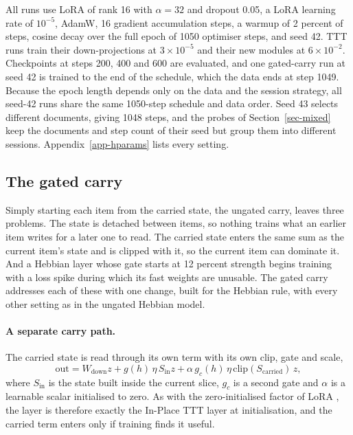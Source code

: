 \documentclass[12pt,a4paper]{report}
\begin{document}
All runs use LoRA of rank 16 with $\alpha = 32$ and dropout 0.05, a LoRA learning rate of $10^{-5}$, AdamW, 16 gradient accumulation steps, a warmup of 2 percent of steps, cosine decay over the full epoch of 1050 optimiser steps, and seed 42. TTT runs train their down-projections at $3 \times 10^{-5}$ and their new modules at $6 \times 10^{-2}$. Checkpoints at steps 200, 400 and 600 are evaluated, and one gated-carry run at seed 42 is trained to the end of the schedule, which the data ends at step 1049. Because the epoch length depends only on the data and the session strategy, all seed-42 runs share the same 1050-step schedule and data order. Seed 43 selects different documents, giving 1048 steps, and the probes of Section~\ref{sec-mixed} keep the documents and step count of their seed but group them into different sessions. Appendix~\ref{app-hparams} lists every setting.

\subsection{The gated carry}
\label{sec-design-method}

Simply starting each item from the carried state, the ungated carry, leaves three problems. The state is detached between items, so nothing trains what an earlier item writes for a later one to read. The carried state enters the same sum as the current item's state and is clipped with it, so the current item can dominate it. And a Hebbian layer whose gate starts at 12 percent strength begins training with a loss spike during which its fast weights are unusable. The gated carry addresses each of these with one change, built for the Hebbian rule, with every other setting as in the ungated Hebbian model.

\paragraph{A separate carry path.} The carried state is read through its own term with its own clip, gate and scale,
\begin{equation}
  \mathrm{out} = W_{\mathrm{down}} z + g(h)\, \eta\, S_{\mathrm{in}} z + \alpha\, g_c(h)\, \eta\, \mathrm{clip}(S_{\mathrm{carried}})\, z ,
\end{equation}
where $S_{\mathrm{in}}$ is the state built inside the current slice, $g_c$ is a second gate and $\alpha$ is a learnable scalar initialised to zero. As with the zero-initialised factor of LoRA \citep{hu2022lora}, the layer is therefore exactly the In-Place TTT layer at initialisation, and the carried term enters only if training finds it useful.
\end{document}
